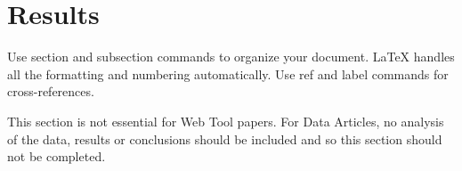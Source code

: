 \section*{Results}
Use section and subsection commands to organize your document. \LaTeX{} handles all the formatting and numbering automatically. Use ref and label commands for cross-references.

This section is not essential for Web Tool papers.
For Data Articles, no analysis of the data, results or conclusions should be included and so this section should not be completed.

